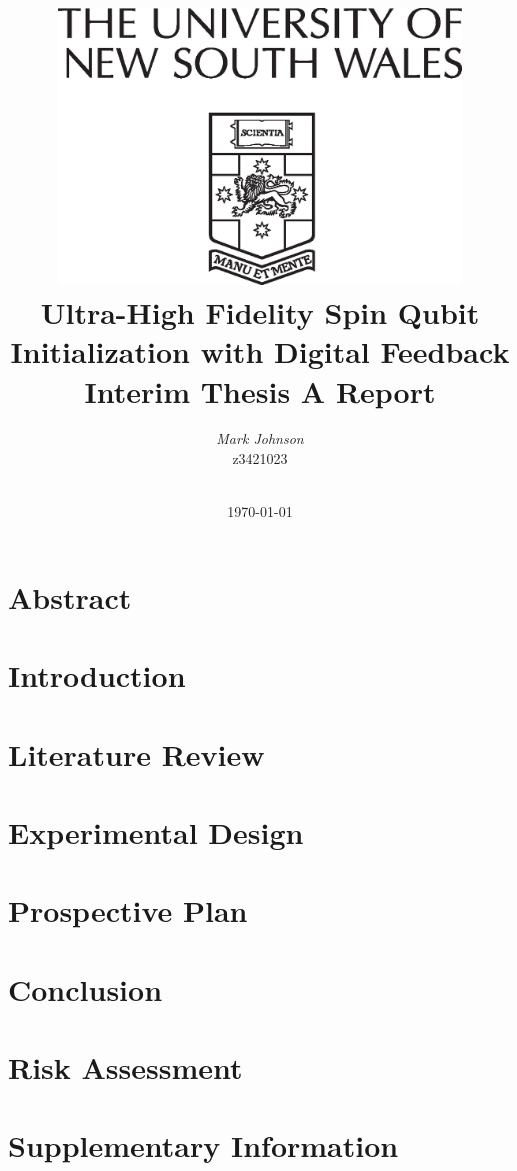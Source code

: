 \documentclass[a4paper, english, twoside, 12pt]{article}
\title{
	\centering\includegraphics[width=0.8\textwidth]{Arms-vl}\\
	\vspace{1cm}
	\Huge \textbf{Ultra-High Fidelity Spin Qubit Initialization with Digital Feedback}\\
	\vspace{1cm}
    \huge Interim Thesis A Report
	}
\author{\Huge \emph{Mark Johnson}\\
        \Large z3421023 \\\\ 
        }
\date{\today} %
\begin{document}
%
%

\thispagestyle{empty}

\pagebreak


\listoftodos

\pagebreak

\tableofcontents
\listoffigures
\listoftables

\pagebreak
{}

\section{Abstract}

\section{Introduction}

\section{Literature Review}

\section{Experimental Design}

\section{Prospective Plan}

\section{Conclusion}




\begin{appendices} 
	\section{Risk Assessment}
	
	\section{Supplementary Information}
	
\end{appendices}
\end{document}
